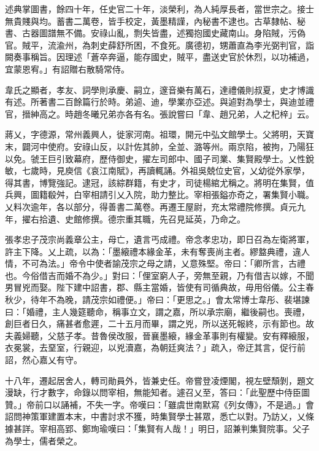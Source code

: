 \begin{pinyinscope}
 述典掌圖書，餘四十年，任史官二十年，淡榮利，為人純厚長者，當世宗之。接士無貴賤與均。蓄書二萬卷，皆手校定，黃墨精謹，內秘書不逮也。古草隸帖、秘書、古器圖譜無不備。安祿山亂，剽失皆盡，述獨抱國史藏南山。身陷賊，污偽官。賊平，流渝州，為刺史薛舒所困，不食死。廣德初，甥蕭直為李光弼判官，詣闕奏事稱旨。因理述「蒼卒奔逼，能存國史，賊平，盡送史官於休烈，以功補過，宜蒙恩宥。」有詔贈右散騎常侍。



 韋氏之顯者，孝友、詞學則承慶、嗣立，邃音樂有萬石，達禮儀則叔夏，史才博識有述。所著書二百餘篇行於時。弟逌、迪，學業亦亞述。與逌對為學士，與迪並禮官，搢紳高之。時趙冬曦兄弟亦各有名。張說嘗曰「韋、趙兄弟，人之杞梓」云。



 蔣乂，字德源，常州義興人，徙家河南。祖環，開元中弘文館學士。父將明，天寶末，闢河中使府。安祿山反，以計佐其帥，全並、潞等州。兩京陷，被拘，乃陽狂以免。虢王巨引致幕府，歷侍御史，擢左司郎中、國子司業、集賢殿學士。乂性銳敏，七歲時，見庾信《哀江南賦》，再讀輒誦。外祖吳兢位史官，乂幼從外家學，得其書，博覽強記。逮冠，該綜群籍，有史才，司徒楊綰尤稱之。將明在集賢，值兵興，圖籍殽舛，白宰相請引乂入院，助力整比。宰相張鎰亦奇之，署集賢小職。乂料次逾年，各以部分，得善書二萬卷。再遷王屋尉，充太常禮院修撰。貞元九年，擢右拾遺、史館修撰。德宗重其職，先召見延英，乃命之。



 張孝忠子茂宗尚義章公主，母亡，遺言丐成禮。帝念孝忠功，即日召為左衛將軍，許主下降。乂上疏，以為：「墨縗禮本緣金革，未有奪喪尚主者。繆盩典禮，違人情，不可為法。」帝令中使者諭茂宗之母之請，乂意殊堅。帝曰：「卿所言，古禮也。今俗借吉而婚不為少。」對曰：「俚室窮人子，旁無至親，乃有借吉以嫁，不聞男冒兇而娶。陛下建中詔書，郡、縣主當婚，皆使有司循典故，毋用俗儀。公主春秋少，待年不為晚，請茂宗如禮便。」帝曰：「更思之。」會太常博士韋彤、裴堪諫曰：「婚禮，主人幾筵聽命，稱事立文，謂之嘉，所以承宗廟，繼後嗣也。喪禮，創巨者日久，痛甚者愈遲，二十五月而畢，謂之兇，所以送死報終，示有節也。故夫義婦聽，父慈子孝。昔魯侯改服，晉襄墨縗，緣金革事則有權變。安有釋縗服，衣冕裳，去堊室，行親迎，以兇瀆嘉，為朝廷爽法？」疏入，帝迂其言，促行前詔，然心嘉乂有守。



 十八年，遷起居舍人，轉司勛員外，皆兼史任。帝嘗登凌煙閣，視左壁頹剝，題文漫缺，行才數字，命錄以問宰相，無能知者。遽召乂至，答曰：「此聖歷中侍臣圖贊。」帝前口以誦補，不失一字。帝嘆曰：「雖虞世南默寫《列女傳》，不是過。」會詔問神策軍建置本末，中書討求不獲，時集賢學士甚眾，悉亡以對。乃訪乂，乂條據甚詳。宰相高郢、鄭珣瑜嘆曰：「集賢有人哉！」明日，詔兼判集賢院事。父子為學士，儒者榮之。




\end{pinyinscope}
